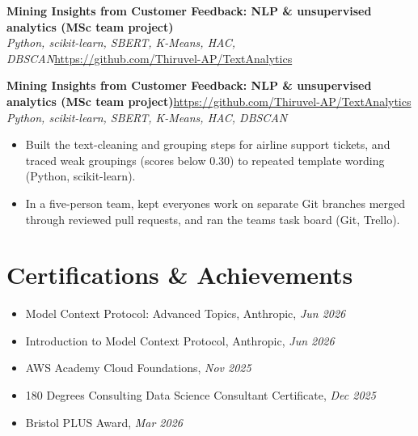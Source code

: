 \documentclass[a4paper,11pt]{article}
\newcommand{\project}[3]{%
  \textbf{#1}\hfill#3\\ {\color{muted}\small\textit{#2}}\par}
\begin{document}
\else
\textbf{Mining Insights from Customer Feedback: NLP \& unsupervised analytics (MSc team project)}\\ {\color{muted}\small\textit{Python, scikit-learn, SBERT, K-Means, HAC, DBSCAN}}\hfill{\small\url{https://github.com/Thiruvel-AP/TextAnalytics}}\par
\fi
\else
\project{Mining Insights from Customer Feedback: NLP \& unsupervised analytics (MSc team project)}{Python, scikit-learn, SBERT, K-Means, HAC, DBSCAN}{\url{https://github.com/Thiruvel-AP/TextAnalytics}}
\fi
\begin{itemize}
  \item Built the text-cleaning and grouping steps for airline support tickets, and traced weak groupings (scores below 0.30) to repeated template wording (Python, scikit-learn).
  \item In a five-person team, kept everyone\textquotesingle{}s work on separate Git branches merged through reviewed pull requests, and ran the team\textquotesingle{}s task board (Git, Trello).
\end{itemize}


\section{Certifications \& Achievements}
\begin{itemize}
  \item Model Context Protocol: Advanced Topics, Anthropic, \textit{Jun 2026}
  \item Introduction to Model Context Protocol, Anthropic, \textit{Jun 2026}
  \item AWS Academy Cloud Foundations, \textit{Nov 2025}
  \item 180 Degrees Consulting Data Science Consultant Certificate, \textit{Dec 2025}
  \item Bristol PLUS Award, \textit{Mar 2026}
\end{itemize}
\end{document}
